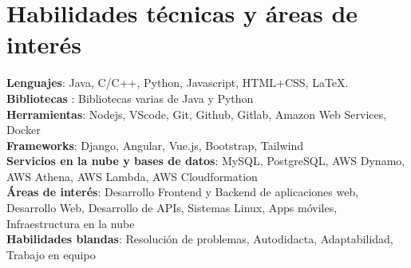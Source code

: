 \documentclass[a4paper,11pt]{article}
\makeatletter
\newcommand{\resumePOR}[3]{
\vspace{0.5mm}\item
    \begin{tabular*}{0.97\textwidth}[t]{l@{\extracolsep{\fill}}r}
        \textbf{#1}\hspace{0.3mm}#2 & \textit{\small{#3}} 
    \end{tabular*}
    \vspace{-2mm}
}
\newcommand{\resumeSubHeadingListStart}{\begin{itemize}[leftmargin=*,labelsep=0mm]}
\newcommand{\resumeItemListStart}{\begin{justify}\begin{itemize}[leftmargin=3ex, rightmargin=2ex, noitemsep,labelsep=1.2mm,itemsep=0mm]\small}
\newcommand{\resumeSubHeadingListEnd}{\end{itemize}\vspace{2mm}}
\newcommand{\resumeItemListEnd}{\end{itemize}\end{justify}\vspace{-2mm}}
\makeatother
\begin{document}
\section{\textbf{Habilidades técnicas y áreas de interés}}
 \begin{itemize}[leftmargin=0.05in, label={}]
    \small{\item{
     \textbf{Lenguajes}{: Java, C/C++, Python, Javascript, HTML+CSS, LaTeX. } \\
     \textbf{Bibliotecas }{: Bibliotecas varias de Java y Python }\\ 
     \textbf{Herramientas}{: Nodejs, VScode, Git, Github, Gitlab, Amazon Web Services, Docker } \\ 
     \textbf{Frameworks}{: Django, Angular, Vue.js, Bootstrap, Tailwind } \\
     \textbf{Servicios en la nube y bases de datos}{: MySQL, PostgreSQL, AWS Dynamo, AWS Athena, AWS Lambda, AWS Cloudformation } \\   
     \textbf{Áreas de interés}{: Desarrollo Frontend y Backend de aplicaciones web, Desarrollo Web, Desarrollo de APIs, Sistemas Linux, Apps móviles, Infraestructura en la nube } \\
     \textbf{Habilidades blandas}{: Resolución de problemas, Autodidacta, Adaptabilidad, Trabajo en equipo} \\
    }}
 \end{itemize}
 \vspace{-16pt}



\begin{comment}
\section{\textbf{Positions of Responsibility}}
\vspace{-0.4mm}
\resumeSubHeadingListStart
\resumePOR{On Desk Registrations Volunteer } %
    {Aarhant Cyber Week Event - RCOEM, Nagpur} %
    {Oct - Dec 2022} %
    \resumeItemListStart
    \item {Helped to attract close to 300 attendees to the event.}
    \item {Collected over Rs. 20,000 in entry fees for different activities.}
    \resumeItemListEnd

\resumeSubHeadingListEnd
\vspace{-5mm}
\end{comment}
\end{document}
